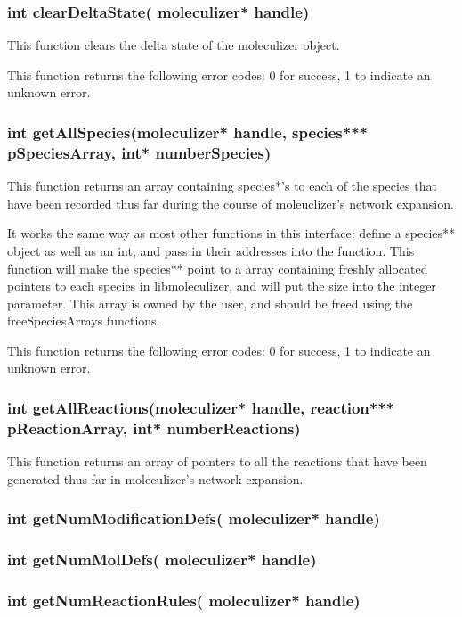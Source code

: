 \subsubsection{int clearDeltaState( moleculizer* handle)}
This function clears the delta state of the moleculizer object.  

This function returns the following error codes: 0 for success, 1 to
indicate an unknown error.

\subsubsection{int getAllSpecies(moleculizer* handle, species***
  pSpeciesArray, int* numberSpecies)}

This function returns an array containing species*'s to each of the
species that have been recorded thus far during the course of
moleuclizer's network expansion.  

It works the same way as most other functions in this interface:
define a species** object as well as an int, and pass in their
addresses into the function.  This function will make the species**
point to a array containing freshly allocated pointers to each species
in libmoleculizer, and will put the size into the integer parameter.
This array is owned by the user, and should be freed using the
freeSpeciesArrays functions.

This function returns the following error codes: 0 for success, 1 to
indicate an unknown error.

\subsubsection{int getAllReactions(moleculizer* handle, reaction***
  pReactionArray, int* numberReactions)}

This function returns an array of pointers to all the reactions that
have been generated thus far in moleculizer's network expansion.  

\subsubsection{int getNumModificationDefs( moleculizer* handle)}

\subsubsection{int getNumMolDefs( moleculizer* handle)}

\subsubsection{int getNumReactionRules( moleculizer* handle)}

